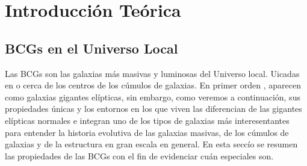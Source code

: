 
\chapter{Introducci\'on Te\'orica} %

\label{ch:introduccion} %




\section{BCGs en el Universo Local}

Las BCGs son las galaxias m\'as masivas y luminosas del Universo local. Uicadas en o cerca de los centros de los c\'umulos de galaxias. En primer orden , aparecen como galaxias gigantes el\'ipticas,
sin embargo, como veremos a continuaci\'on, sus propiedades \'unicas y los entornos en los que
viven las diferencian de las gigantes el\'ipticas normales e integran uno de los tipos
de galaxias m\'as interesentantes para entender la historia evolutiva de las galaxias masivas, 
de los c\'umulos de galaxias y de la estructura en gran escala en general.
En esta secc\'io se resumen las propiedades de las BCGs con el fin de evidenciar
cu\'an especiales son.

